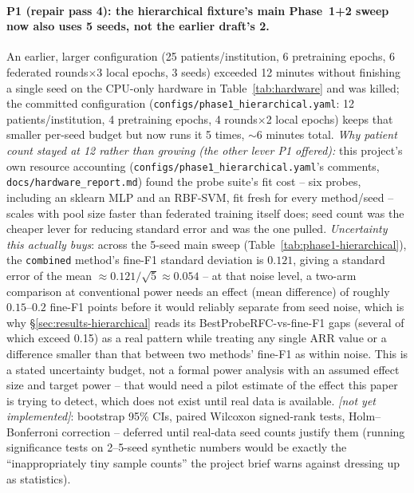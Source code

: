 \documentclass[11pt]{article}
\newcommand{\status}[1]{\textit{[#1]}}
\begin{document}
\paragraph{P1 (repair pass 4): the hierarchical fixture's main Phase~1+2
sweep now also uses \textbf{5 seeds}, not the earlier draft's 2.} An
earlier, larger configuration (25 patients/institution, 6 pretraining
epochs, 6 federated rounds$\times$3 local epochs, 3 seeds) exceeded 12
minutes without finishing a single seed on the CPU-only hardware in
Table~\ref{tab:hardware} and was killed; the committed configuration
(\texttt{configs/phase1\_hierarchical.yaml}: 12 patients/institution, 4
pretraining epochs, 4 rounds$\times$2 local epochs) keeps that smaller
per-seed budget but now runs it 5 times, $\sim$6 minutes total. \emph{Why
patient count stayed at 12 rather than growing (the other lever
P1 offered):} this project's own resource accounting
(\texttt{configs/phase1\_hierarchical.yaml}'s comments,
\texttt{docs/hardware\_report.md}) found the probe suite's fit cost --
six probes, including an sklearn MLP and an RBF-SVM, fit fresh for every
method/seed -- scales with pool size faster than federated training
itself does; seed count was the cheaper lever for reducing standard error
and was the one pulled. \emph{Uncertainty this actually buys}: across the
5-seed main sweep (Table~\ref{tab:phase1-hierarchical}), the
\texttt{combined} method's fine-F1 standard deviation is $0.121$, giving a
standard error of the mean $\approx 0.121/\sqrt{5} \approx 0.054$ -- at
that noise level, a two-arm comparison at conventional power needs an
effect (mean difference) of roughly $0.15$--$0.2$ fine-F1 points before it
would reliably separate from seed noise, which is why \S\ref{sec:results-hierarchical}
reads its BestProbeRFC-vs-fine-F1 gaps (several of which exceed 0.15) as a
real pattern while treating any single ARR value or a difference smaller
than that between two methods' fine-F1 as within noise. This is a stated
uncertainty budget, not a formal power analysis with an assumed effect
size and target power -- that would need a pilot estimate of the effect
this paper is trying to detect, which does not exist until real data is
available. \status{not yet implemented}: bootstrap 95\% CIs, paired
Wilcoxon signed-rank tests, Holm--Bonferroni correction -- deferred until
real-data seed counts justify them (running significance tests on 2--5-seed
synthetic numbers would be exactly the ``inappropriately tiny sample
counts'' the project brief warns against dressing up as statistics).
\end{document}
